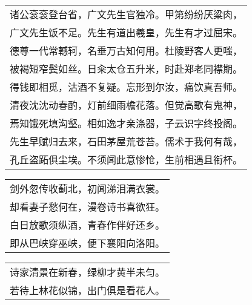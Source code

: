 \nopagebreak%
\nopagebreak%
\noindent\begin{minipage}{\linewidth}
  \vskip-3pt\begin{table}[H]
    \centering
    \begin{tabular}{@{}l@{}}
诸公衮衮登台省，广文先生官独冷。甲第纷纷厌粱肉，\\
广文先生饭不足。先生有道出羲皇，先生有才过屈宋。\\
德尊一代常轗轲，名垂万古知何用。杜陵野客人更嗤，\\
被褐短窄鬓如丝。日籴太仓五升米，时赴郑老同襟期。\\
得钱即相觅，沽酒不复疑。忘形到尔汝，痛饮真吾师。\\
清夜沈沈动春酌，灯前细雨檐花落。但觉高歌有鬼神，\\
焉知饿死填沟壑。相如逸才亲涤器，子云识字终投阁。\\
先生早赋归去来，石田茅屋荒苍苔。儒术于我何有哉，\\
孔丘盗跖俱尘埃。不须闻此意惨怆，生前相遇且衔杯。
    \end{tabular}
  \end{table}
\end{minipage}
\vspace{1cm}


\nopagebreak%
\nopagebreak%
\noindent\begin{minipage}{\linewidth}
  \vskip-3pt\begin{table}[H]
    \centering
    \begin{tabular}{@{}l@{}}
剑外忽传收蓟北，初闻涕泪满衣裳。\\
却看妻子愁何在，漫卷诗书喜欲狂。\\
白日放歌须纵酒，青春作伴好还乡。\\
即从巴峡穿巫峡，便下襄阳向洛阳。
    \end{tabular}
  \end{table}
\end{minipage}
\vspace{1cm}


\nopagebreak%
\nopagebreak%
\noindent\begin{minipage}{\linewidth}
  \vskip-3pt\begin{table}[H]
    \centering
    \begin{tabular}{@{}l@{}}
诗家清景在新春，绿柳才黄半未匀。\\
若待上林花似锦，出门俱是看花人。
    \end{tabular}
  \end{table}
\end{minipage}
\vspace{1cm}


